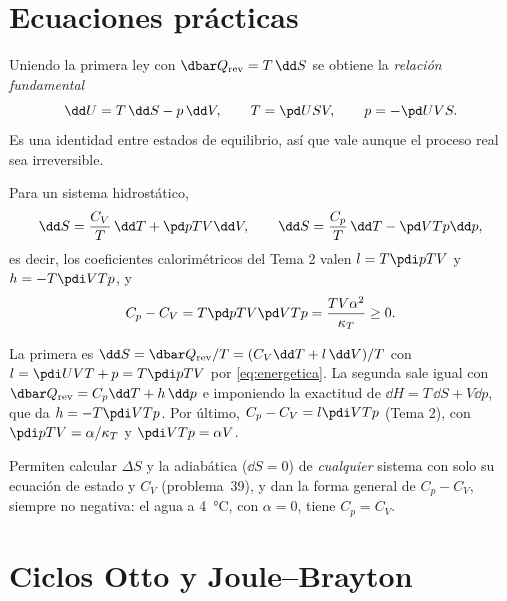 \section{Ecuaciones prácticas}

Uniendo la primera ley con $\dbar Q_{\mathrm{rev}}=T\,\dd S$ se obtiene la \emph{relación fundamental}
\begin{equation}\label{eq:fundamental}
  \dd U=T\,\dd S-p\,\dd V,\qquad T=\pd USV,\qquad p=-\pd UVS .
\end{equation}
Es una identidad entre estados de equilibrio, así que vale aunque el proceso real sea irreversible.

\begin{proposicion}[Ecuaciones $T\,\dd S$]
Para un sistema hidrostático,
\begin{equation}\label{eq:TdS}
  \dd S=\frac{C_V}{T}\,\dd T+\pd pTV\dd V,\qquad
  \dd S=\frac{C_p}{T}\,\dd T-\pd VTp\dd p,
\end{equation}
es decir, los coeficientes calorimétricos del Tema 2 valen $l=T\pdi pTV$ y $h=-T\pdi VTp$, y
\begin{equation}\label{eq:CpCVgeneral}
  C_p-C_V=T\pd pTV\pd VTp=\frac{TV\alpha^2}{\kappa_T}\geq0 .
\end{equation}
\end{proposicion}

\begin{demostracion}
La primera es $\dd S=\dbar Q_{\mathrm{rev}}/T=(C_V\dd T+l\,\dd V)/T$ con $l=\pdi UVT+p=T\pdi pTV$ por
\eqref{eq:energetica}. La segunda sale igual con $\dbar Q_{\mathrm{rev}}=C_p\dd T+h\,\dd p$ e imponiendo la
exactitud de $\dd H=T\,\dd S+V\dd p$, que da $h=-T\pdi VTp$. Por último, $C_p-C_V=l\pdi VTp$ (Tema 2), con
$\pdi pTV=\alpha/\kappa_T$ y $\pdi VTp=\alpha V$.
\end{demostracion}

\begin{observacion}
Permiten calcular $\Delta S$ y la adiabática ($\dd S=0$) de \emph{cualquier} sistema con solo su ecuación de
estado y $C_V$ (problema~39), y dan la forma general de $C_p-C_V$, siempre no negativa: el agua a \SI{4}{\celsius},
con $\alpha=0$, tiene $C_p=C_V$.
\end{observacion}

\section{Ciclos Otto y Joule--Brayton}

